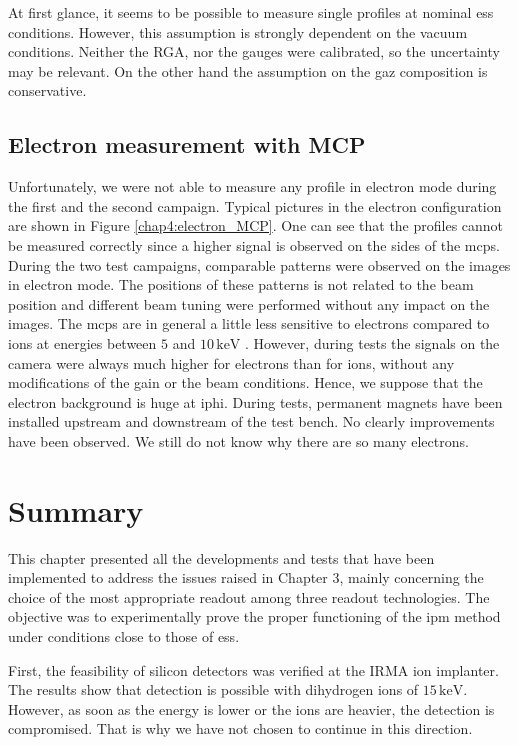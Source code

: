 \begin{refsection}
  At first glance, it seems to be possible to measure single profiles at nominal \acrshort{ess} conditions. However, this assumption is strongly dependent on the vacuum conditions. Neither the RGA, nor the gauges were calibrated, so the uncertainty may be relevant. On the other hand the assumption on the gaz composition is conservative.

  

  \FloatBarrier
  \subsection{Electron measurement with MCP}
  Unfortunately, we were not able to measure any profile in electron mode during the first and the second campaign.
  Typical pictures in the electron configuration are shown in Figure \ref{chap4:electron_MCP}. One can see that the profiles cannot be measured correctly since a higher signal is observed on the sides of the \acrshort{mcp}s. During the two test campaigns, comparable patterns were observed on the images in electron mode. The positions of these patterns is not related to the beam position and different beam tuning were performed without any impact on the images.
  The \acrshort{mcp}s are in general a little less sensitive to electrons compared to ions at energies between $5$ and $10\,\mathrm{keV}$ \cite{Wiza1979}.
  However, during tests the signals on the camera were always much higher for electrons than for ions, without any modifications of the gain or the beam conditions.
  Hence, we suppose that the electron background is huge at \acrshort{iphi}.
  During tests, permanent magnets have been installed upstream and downstream of the test bench. No clearly improvements have been observed. We still do not know why there are so many electrons.
  

  \section{Summary}
  \label{ch4:Summary}
  This chapter presented all the developments and tests that have been implemented to address the issues raised in Chapter 3, mainly concerning the choice of the most appropriate readout among three readout technologies. The objective was to experimentally prove the proper functioning of the \acrshort{ipm} method under conditions close to those of \acrshort{ess}.

  First, the feasibility of silicon detectors was verified at the IRMA ion implanter. The results show that detection is possible with dihydrogen ions of $15\,\mathrm{keV}$. However, as soon as the energy is lower or the ions are heavier, the detection is compromised. That is why we have not chosen to continue in this direction.


\end{refsection}
